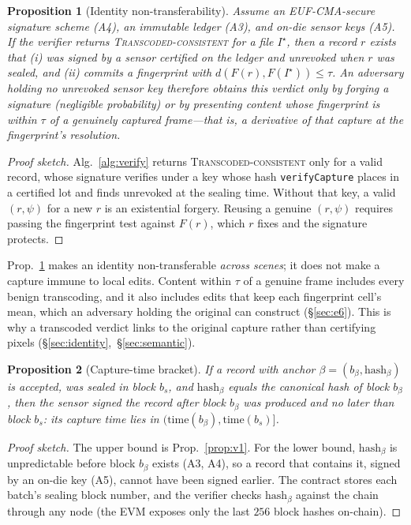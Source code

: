 \documentclass[journal]{IEEEtran}
\newtheorem{proposition}{Proposition}
\begin{document}
\begin{proposition}[Identity non-transferability]\label{prop:identity}
Assume an EUF-CMA-secure signature scheme \emph{(A4)}, an immutable ledger
\emph{(A3)}, and on-die sensor keys \emph{(A5)}. If the verifier returns
\textsc{Transcoded-consistent} for a file $I^\star$, then a record $r$ exists
that (i) was signed by a sensor certified on the ledger and unrevoked when $r$
was sealed, and (ii) commits a fingerprint with $d(F(r),F(I^\star))\le\tau$. An
adversary holding no unrevoked sensor key therefore obtains this verdict only by
forging a signature (negligible probability) or by presenting content whose
fingerprint is within $\tau$ of a genuinely captured frame---that is, a
derivative of that capture at the fingerprint's resolution.
\end{proposition}
\begin{proof}[Proof sketch]
Alg.~\ref{alg:verify} returns \textsc{Transcoded-consistent} only for a valid
record, whose signature verifies under a key whose hash \texttt{verifyCapture}
places in a certified lot and finds unrevoked at the sealing time. Without that
key, a valid $(r,\psi)$ for a new $r$ is an existential forgery. Reusing a
genuine $(r,\psi)$ requires passing the fingerprint test against $F(r)$, which
$r$ fixes and the signature protects.
\end{proof}

\noindent Prop.~\ref{prop:identity} makes an identity non-transferable
\emph{across scenes}; it does not make a capture immune to local edits. Content
within $\tau$ of a genuine frame includes every benign transcoding, and it also
includes edits that keep each fingerprint cell's mean, which an adversary holding
the original can construct (\S\ref{sec:e6}). This is why a transcoded verdict
links to the original capture rather than certifying pixels
(\S\ref{sec:identity},~\S\ref{sec:semantic}).

\begin{proposition}[Capture-time bracket]\label{prop:bracket}
If a record with anchor $\beta=(b_\beta,\mathrm{hash}_\beta)$ is accepted, was
sealed in block $b_s$, and $\mathrm{hash}_\beta$ equals the canonical hash of block
$b_\beta$, then the sensor signed the record after block $b_\beta$ was produced
and no later than block $b_s$: its capture time lies in
$(\mathrm{time}(b_\beta),\mathrm{time}(b_s)]$.
\end{proposition}
\begin{proof}[Proof sketch]
The upper bound is Prop.~\ref{prop:v1}. For the lower bound, $\mathrm{hash}_\beta$
is unpredictable before block $b_\beta$ exists (A3, A4), so a record that
contains it, signed by an on-die key (A5), cannot have been signed earlier. The
contract stores each batch's sealing block number, and the verifier checks
$\mathrm{hash}_\beta$ against the chain through any node (the EVM exposes only the
last $256$ block hashes on-chain).
\end{proof}
\end{document}
